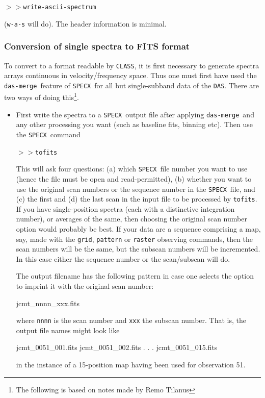\documentclass[11pt,twoside]{starlink}
\providecommand{\SPECX}{\texttt{SPECX}}
\providecommand{\dm}{\texttt{das-merge}}
\providecommand{\SP}{{$>\!>$}}
\begin{document}
\SP \verb|write-ascii-spectrum|

({\tt{w-a-s}} will do). The header information is minimal.

\subsubsection{Conversion of single spectra to FITS format}
\label{sec:specx2fits}
To convert to a format readable by \texttt{CLASS}, it is first necessary
to generate spectra arrays continuous in velocity/frequency
space. Thus one must first have used the \dm\ feature of \SPECX\ for
all but single-subband data of the \texttt{DAS}. There are two ways of
doing this\footnote{The following is based on notes made by Remo
Tilanus}.
\begin{itemize}
\item
First write the spectra to a \SPECX\ output file after applying \dm\
and any other processing you want (such as baseline fits, binning
etc). Then use the
\SPECX\ command

\SP \verb|tofits|

This will ask four questions: (a) which \SPECX\ file number you want
to use (hence the file must be open and read-permitted), (b) whether
you want to use the original scan numbers or the sequence number in
the \SPECX\ file, and (c) the first and (d) the last scan in the input
file to be processed by \texttt{tofits}. If you have single-position
spectra (each with a distinctive integration number), or averages of
the same, then choosing the original scan number option would
probably be best. If your data are a sequence comprising a map, say, made with
the \texttt{grid}, \texttt{pattern} or \texttt{raster} observing commands, then
the scan numbers will be the same, but the subscan numbers will be
incremented. In this case either the sequence number or the
scan/subscan will do.

The output filename has the following pattern in case one selects the
option to imprint it with the original scan number:

\begin{terminalv}
jcmt_nnnn_xxx.fits
\end{terminalv}

where \texttt{nnnn} is the scan number and \texttt{xxx} the subscan
number. That is, the output file names might look like
\begin{terminalv}
     jcmt_0051_001.fits
     jcmt_0051_002.fits
            .
            .
            .
     jcmt_0051_015.fits
\end{terminalv}
in the instance of a 15-position map having been used for observation
51.


\end{itemize}
\end{document}
